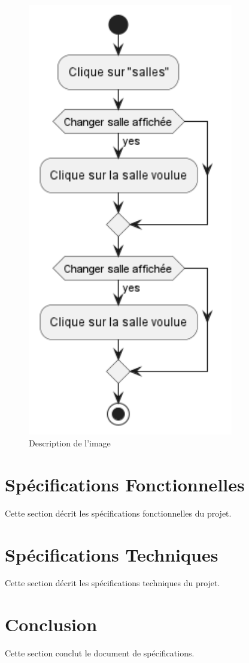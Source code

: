 \documentclass[12pt,a4paper]{article}
\begin{document}
\begin{figure}[h!]
    \centering
    \includegraphics[width=0.8\textwidth]{Diag_activites_UC03.png}
    \caption{Description de l'image}
    \label{fig:emploi_du_temps}
\end{figure}


\section{Spécifications Fonctionnelles}
Cette section décrit les spécifications fonctionnelles du projet.

\section{Spécifications Techniques}
Cette section décrit les spécifications techniques du projet.

\section{Conclusion}
Cette section conclut le document de spécifications.
\end{document}
